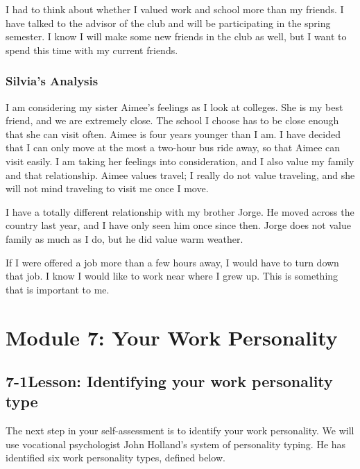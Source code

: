 I had to think about whether I valued work and school more than my friends. I have talked to the advisor of the club and will be participating in the spring semester. I know I will make some new friends in the club as well, but I want to spend this time with my current friends.

\subsubsection*{Silvia's Analysis}
I am considering my sister Aimee's feelings as I look at colleges. She is my best friend, and we are extremely close. The school I choose has to be close enough that she can visit often. Aimee is four years younger than I am. I have decided that I can only move at the most a two-hour bus ride away, so that Aimee can visit easily. I am taking her feelings into consideration, and I also value my family and that relationship. Aimee values travel; I really do not value traveling, and she will not mind traveling to visit me once I move.

I have a totally different relationship with my brother Jorge. He moved across the country last year, and I have only seen him once since then. Jorge does not value family as much as I do, but he did value warm weather.

If I were offered a job more than a few hours away, I would have to turn down that job. I know I would like to work near where I grew up. This is something that is important to me.


\pagebreak \section*{Module 7:	Your Work Personality}
\noindent\makebox[\textwidth]{\rule{\linewidth}{0.4pt}} 
\localtableofcontents
\noindent\makebox[\textwidth]{\rule{\linewidth}{0.4pt}}


\pagebreak \subsection*{7-1\quad Lesson: Identifying your work personality type}
The next step in your self-assessment is to identify your work personality. We will use vocational psychologist John Holland's system of personality typing. He has identified six work personality types, defined below.


